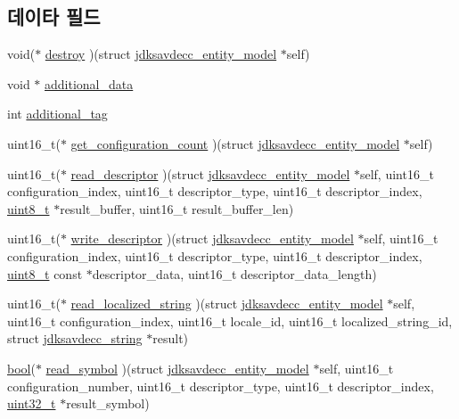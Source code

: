 \subsection*{데이타 필드}
\begin{DoxyCompactItemize}
\item 
void($\ast$ \hyperlink{structjdksavdecc__entity__model_a83266578e7f9c16e098f9ad918b47036}{destroy} )(struct \hyperlink{structjdksavdecc__entity__model}{jdksavdecc\+\_\+entity\+\_\+model} $\ast$self)
\item 
void $\ast$ \hyperlink{structjdksavdecc__entity__model_a9744be07fcadb5e1e549b48913177d3f}{additional\+\_\+data}
\item 
int \hyperlink{structjdksavdecc__entity__model_ad195f108811d5b920d025b7b2b7b5859}{additional\+\_\+tag}
\item 
uint16\+\_\+t($\ast$ \hyperlink{structjdksavdecc__entity__model_aeb06fced137cf5295ee0a10a3b26a057}{get\+\_\+configuration\+\_\+count} )(struct \hyperlink{structjdksavdecc__entity__model}{jdksavdecc\+\_\+entity\+\_\+model} $\ast$self)
\item 
uint16\+\_\+t($\ast$ \hyperlink{structjdksavdecc__entity__model_ab54813a88549a868a747fccd961dc422}{read\+\_\+descriptor} )(struct \hyperlink{structjdksavdecc__entity__model}{jdksavdecc\+\_\+entity\+\_\+model} $\ast$self, uint16\+\_\+t configuration\+\_\+index, uint16\+\_\+t descriptor\+\_\+type, uint16\+\_\+t descriptor\+\_\+index, \hyperlink{stdint_8h_aba7bc1797add20fe3efdf37ced1182c5}{uint8\+\_\+t} $\ast$result\+\_\+buffer, uint16\+\_\+t result\+\_\+buffer\+\_\+len)
\item 
uint16\+\_\+t($\ast$ \hyperlink{structjdksavdecc__entity__model_af01cb0b5655b715f7f5081aa380b06ac}{write\+\_\+descriptor} )(struct \hyperlink{structjdksavdecc__entity__model}{jdksavdecc\+\_\+entity\+\_\+model} $\ast$self, uint16\+\_\+t configuration\+\_\+index, uint16\+\_\+t descriptor\+\_\+type, uint16\+\_\+t descriptor\+\_\+index, \hyperlink{stdint_8h_aba7bc1797add20fe3efdf37ced1182c5}{uint8\+\_\+t} const $\ast$descriptor\+\_\+data, uint16\+\_\+t descriptor\+\_\+data\+\_\+length)
\item 
uint16\+\_\+t($\ast$ \hyperlink{structjdksavdecc__entity__model_ac664c9b20a918f1327572dacf86dbc5f}{read\+\_\+localized\+\_\+string} )(struct \hyperlink{structjdksavdecc__entity__model}{jdksavdecc\+\_\+entity\+\_\+model} $\ast$self, uint16\+\_\+t configuration\+\_\+index, uint16\+\_\+t locale\+\_\+id, uint16\+\_\+t localized\+\_\+string\+\_\+id, struct \hyperlink{structjdksavdecc__string}{jdksavdecc\+\_\+string} $\ast$result)
\item 
\hyperlink{avb__gptp_8h_af6a258d8f3ee5206d682d799316314b1}{bool}($\ast$ \hyperlink{structjdksavdecc__entity__model_a6bc9b49a59ca36662aeb56bc71b9d105}{read\+\_\+symbol} )(struct \hyperlink{structjdksavdecc__entity__model}{jdksavdecc\+\_\+entity\+\_\+model} $\ast$self, uint16\+\_\+t configuration\+\_\+number, uint16\+\_\+t descriptor\+\_\+type, uint16\+\_\+t descriptor\+\_\+index, \hyperlink{parse_8c_a6eb1e68cc391dd753bc8ce896dbb8315}{uint32\+\_\+t} $\ast$result\+\_\+symbol)
\end{DoxyCompactItemize}


